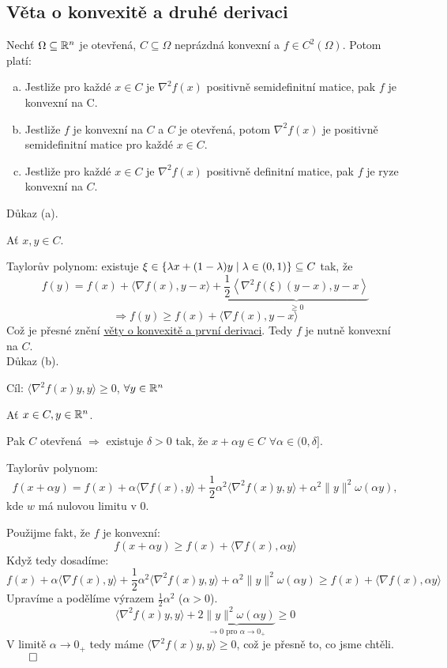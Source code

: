 \subsection{Věta o konvexitě a druhé derivaci}\label{konvDDeriv}
Nechť $\Omega \subseteq \mathbb{R}^n$ je otevřená, $C \subseteq \Omega$ neprázdná konvexní a $f \in C^{2} (\Omega)$. Potom platí:
\begin{enumerate}[(a)]
    \item Jestliže pro každé $x \in C$ je $\nabla^2 f(x)$ positivně semidefinitní matice, pak $f$ je konvexní na C.
    \item Jestliže $f$ je konvexní na $C$ a $C$ je otevřená, potom $\nabla^2 f(x)$ je positivně semidefinitní matice pro
    každé $x \in C$.
    \item Jestliže pro každé $x \in C$ je $\nabla^2 f(x)$ positivně definitní matice, pak $f$ je ryze konvexní na $C$.
\end{enumerate}

\newpage
Důkaz (a).

Ať $x, y \in C$.

Taylorův polynom: existuje $\xi \in \left\lbrace \lambda x + (1-\lambda)y \mid \lambda \in (0,1) \right\rbrace \subseteq C$ tak, že
\[
    f(y) = f(x) + \langle \nabla f(x), y-x\rangle + \underbrace{\frac{1}{2} \left\langle \nabla^2 f(\xi) (y-x),
    y-x\right\rangle}_{\geq 0}
\]
\[
    \Rightarrow f(y) \geq f(x) + \langle \nabla f(x), y-x\rangle
\]
Což je přesné znění \hyperref[konvDeriv]{věty o konvexitě a první derivaci}. Tedy $f$ je nutně konvexní na $C$.
\\
Důkaz (b).

Cíl: $\langle \nabla^2 f(x)y, y\rangle \geq 0$, $\forall y \in \mathbb{R}^n$

Ať $x \in C, y \in \mathbb{R}^n$.

Pak
$C$ otevřená $\Rightarrow$ existuje $\delta > 0$ tak, že $x + \alpha y \in C$ $\forall \alpha \in (0, \delta]$.

Taylorův polynom:
\[
    f(x+ \alpha y) = f(x) + \alpha \langle \nabla f(x), y\rangle + \frac{1}{2}\alpha^2 \langle \nabla^2 f(x)y, y\rangle
    + \alpha^2 \| y\|^2 \omega(\alpha y),
\]
kde $w$ má nulovou limitu v $0$.

Použijme fakt, že $f$ je konvexní:
\[
    f(x+\alpha y) \geq f(x) + \langle \nabla f(x), \alpha y\rangle
\]
Když tedy dosadíme:
\[
    f(x) + \alpha \langle \nabla f(x), y\rangle + \frac{1}{2}\alpha^2 \langle \nabla^2 f(x)y, y\rangle
    + \alpha^2 \| y\|^2 \omega(\alpha y) \geq f(x) + \langle \nabla f(x), \alpha y\rangle
\]
Upravíme a podělíme výrazem $\frac{1}{2}\alpha^2$ ($\alpha > 0$).
\[
   \langle \nabla^2 f(x)y, y\rangle + \underbrace{2 \| y\|^2 \omega(\alpha y)}_{\rightarrow 0 \text{ pro }
   \alpha \rightarrow 0_+} \geq 0
\]
V limitě $\alpha \rightarrow 0_+$ tedy máme $\langle \nabla^2 f(x)y, y\rangle \geq 0$, což je přesně to, co jsme chtěli.
$\qed$

